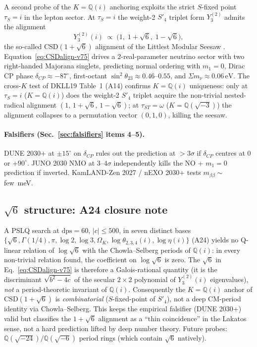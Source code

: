 \documentclass[a4paper,11pt]{article}
\newcommand{\Spf}{S'_4}
\newcommand{\OmK}{\Omega_K}
\newcommand{\Qi}{\mathbb{Q}(i)}
\theoremstyle{definition}
\theoremstyle{remark}
\begin{document}
A second probe of the $K=\Qi$ anchoring exploits the strict
$S$-fixed point $\tau_S=i$ in the lepton sector.  At
$\tau_S=i$ the weight-2 $\Spf$ triplet form $Y_3^{(2)}$ admits
the alignment
\begin{equation}
\label{eq:CSDalign-v75}
  Y_3^{(2)}(i) \;\propto\; \bigl(1,\;1+\sqrt{6},\;1-\sqrt{6}\bigr),
\end{equation}
the so-called CSD$(1+\sqrt{6})$ alignment of the Littlest Modular
Seesaw \cite{DKLL19,LMS22}.  Equation~\eqref{eq:CSDalign-v75}
drives a 2-real-parameter neutrino sector with two right-handed
Majorana singlets, predicting normal ordering with $m_1=0$,
Dirac CP phase $\delta_{CP}\approx -87^{\circ}$, first-octant
$\sin^2\theta_{23}\approx 0.46$--$0.55$, and
$\Sigma m_\nu\approx 0.06\,\mathrm{eV}$.  The cross-$K$ test of
DKLL19 Table~1 (A14) confirms $K=\Qi$ uniqueness: only at
$\tau_S=i$ ($K=\Qi$) does the weight-2 $\Spf$ triplet acquire
the non-trivial nested-radical alignment $(1,\,1+\sqrt 6,\,
1-\sqrt 6)$; at $\tau_{ST}=\omega$ ($K=\mathbb{Q}(\sqrt{-3})$)
the alignment collapses to a permutation vector $(0,1,0)$,
killing the seesaw.

\paragraph{Falsifiers (Sec.~\ref{sec:falsifiers} items 4--5).}
DUNE 2030+ at $\pm 15^{\circ}$ on $\delta_{CP}$ rules out the
prediction at $>3\sigma$ if $\delta_{CP}$ centres at $0$ or
$+90^{\circ}$.  JUNO 2030 NMO at $3$--$4\sigma$ \cite{JUNO22}
independently kills the NO + $m_1=0$ prediction if inverted.
KamLAND-Zen 2027 / nEXO 2030+ tests $m_{\beta\beta}\sim$ few~meV.

\subsection{$\sqrt{6}$ structure: A24 closure note}
\label{sec:sqrt6}

A PSLQ search at $\mathrm{dps}=60$, $|c|\le 500$, in seven
distinct bases $\{\sqrt 6,\Gamma(1/4),\pi,\log 2,\log 3,\OmK,
\log\theta_{2,3,4}(i),\log\eta(i)\}$ (A24) yields no Q-linear
relation of $\log\sqrt 6$ with the Chowla--Selberg periods of
$\Qi$: in every non-trivial relation found, the coefficient on
$\log\sqrt 6$ is zero.  The $\sqrt 6$ in
Eq.~\eqref{eq:CSDalign-v75} is therefore a Galois-rational
quantity (it is the discriminant $\sqrt{b^2-4c}$ of the secular
$2\times 2$ polynomial of $Y_3^{(2)}(i)$ eigenvalues),
\emph{not} a period-theoretic invariant of $\Qi$.  Consequently
the $K=\Qi$ anchor of CSD$(1+\sqrt 6)$ is \emph{combinatorial}
($S$-fixed-point of $\Spf$), not a deep CM-period identity via
Chowla--Selberg.  This keeps the empirical falsifier (DUNE
2030+) valid but classifies the $1+\sqrt 6$ alignment as a
``thin coincidence'' in the Lakatos sense, not a hard prediction
lifted by deep number theory.  Future probes:
$\mathbb{Q}(\sqrt{-24})/\mathbb{Q}(\sqrt{-6})$ period rings
(which contain $\sqrt 6$ natively).
\end{document}
